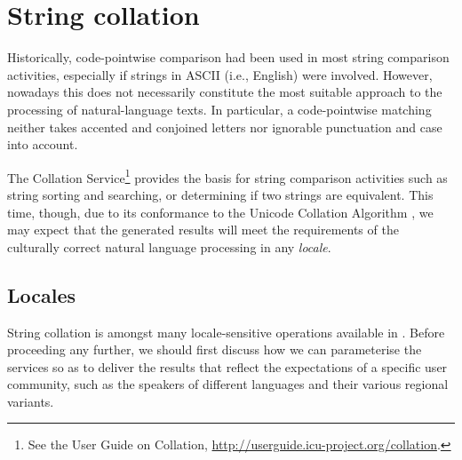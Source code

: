 \documentclass[nojss]{jss}\usepackage[]{graphicx}\usepackage[]{color}
\begin{document}


\section{String collation}\label{Sec:collator}



Historically, code-pointwise comparison had been used in most string comparison
activities, especially if strings in ASCII (i.e., English) were
involved. However, nowadays %
this does not necessarily constitute the most suitable
approach to the processing of natural-language texts.
In particular, a code-pointwise matching
neither takes accented and conjoined letters nor ignorable punctuation and case
into account.



The  Collation Service\footnote{See the  User Guide on {Collation},
\url{http://userguide.icu-project.org/collation}.}
provides the basis for string comparison activities  such as
string sorting and searching, or determining if two strings are equivalent.
This time, though, due to its conformance to
the Unicode Collation Algorithm \citep{uts10:collation},
we may expect that the generated results
will meet the requirements of the culturally correct
natural language processing in any \textit{locale}.





\subsection{Locales}

String collation is amongst many locale-sensitive operations  available
in . Before proceeding any further, we should
first discuss how we can parameterise the  services
so as to deliver the results that reflect the expectations
of a specific user community, such as the speakers of different languages
and their various regional variants.
\end{document}

